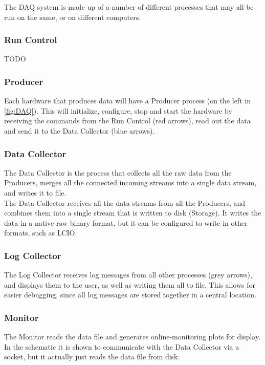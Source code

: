 The DAQ system is made up of a number of different processes that may all be run on the same,
or on different computers. 

\subsubsection{Run Control}
TODO\\


\subsubsection{Producer}
Each hardware that produces data will have a Producer process (on the left in \autoref{fig:DAQ}).
This will initialize, configure, stop and start the hardware by receiving the commands from the Run Control (red arrows), read out the data and send it to the Data Collector (blue arrows).

\subsubsection{Data Collector}
The Data Collector is the process that collects all the raw data from the Producers,
merges all the connected incoming streams into a single data stream, and writes it to file.\\

The Data Collector receives all the data streams from all the Producers,
and combines them into a single stream that is written to disk (Storage).
It writes the data in a native raw binary format,
but it can be configured to write in other formats, such as \gls{LCIO}.

\subsubsection{Log Collector}
The Log Collector receives log messages from all other processes (grey arrows),
and displays them to the user, as well as writing them all to file.
This allows for easier debugging, since all log messages are stored together in a central location.

\subsubsection{Monitor}
The Monitor reads the data file and generates online-monitoring plots for display.
In the schematic it is shown to communicate with the Data Collector via a socket,
but it actually just reads the data file from disk.\\

